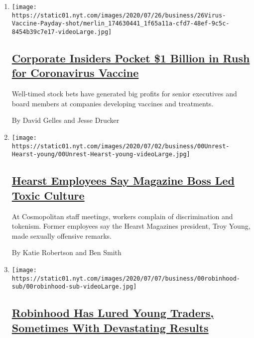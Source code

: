 \begin{enumerate}
\def\labelenumi{\arabic{enumi}.}
\item
  \texttt{[image: https://static01.nyt.com/images/2020/07/26/business/26Virus-Vaccine-Payday-shot/merlin\_174630441\_1f65a11a-cfd7-48ef-9c5c-8454b39c7e17-videoLarge.jpg]}

  \hypertarget{corporate-insiders-pocket-1-billion-in-rush-for-coronavirus-vaccine}{%
  \subsection{\texorpdfstring{\href{/2020/07/25/business/coronavirus-vaccine-profits-vaxart.html}{Corporate
  Insiders Pocket \$1 Billion in Rush for Coronavirus
  Vaccine}}{Corporate Insiders Pocket \$1 Billion in Rush for Coronavirus Vaccine}}\label{corporate-insiders-pocket-1-billion-in-rush-for-coronavirus-vaccine}}

  Well-timed stock bets have generated big profits for senior executives
  and board members at companies developing vaccines and treatments.

  By David Gelles and Jesse Drucker
\item
  \texttt{[image: https://static01.nyt.com/images/2020/07/02/business/00Unrest-Hearst-young/00Unrest-Hearst-young-videoLarge.jpg]}

  \hypertarget{hearst-employees-say-magazine-boss-led-toxic-culture}{%
  \subsection{\texorpdfstring{\href{/2020/07/22/business/media/hearst-harassment-troy-young.html}{Hearst
  Employees Say Magazine Boss Led Toxic
  Culture}}{Hearst Employees Say Magazine Boss Led Toxic Culture}}\label{hearst-employees-say-magazine-boss-led-toxic-culture}}

  At Cosmopolitan staff meetings, workers complain of discrimination and
  tokenism. Former employees say the Hearst Magazines president, Troy
  Young, made sexually offensive remarks.

  By Katie Robertson and Ben Smith
\item
  \texttt{[image: https://static01.nyt.com/images/2020/07/07/business/00robinhood-sub/00robinhood-sub-videoLarge.jpg]}

  \hypertarget{robinhood-has-lured-young-traders-sometimes-with-devastating-results}{%
  \subsection{\texorpdfstring{\href{/2020/07/08/technology/robinhood-risky-trading.html}{Robinhood
  Has Lured Young Traders, Sometimes With Devastating
  Results}}{Robinhood Has Lured Young Traders, Sometimes With Devastating Results}}\label{robinhood-has-lured-young-traders-sometimes-with-devastating-results}}


\end{enumerate}
